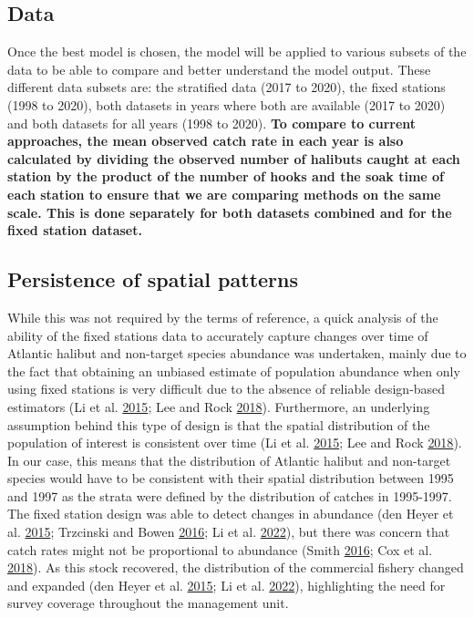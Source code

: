 \documentclass[12pt]{article}\usepackage[]{graphicx}\usepackage[]{color}
\begin{document}
\hypertarget{data}{%
\subsection{Data}\label{data}}

Once the best model is chosen, the model will be applied to various subsets of the data to be able to compare and better understand the model output. These different data subsets are: the stratified data (2017 to 2020), the fixed stations (1998 to 2020), both datasets in years where both are available (2017 to 2020) and both datasets for all years (1998 to 2020). \textbf{To compare to current approaches, the mean observed catch rate in each year is also calculated by dividing the observed number of halibuts caught at each station by the product of the number of hooks and the soak time of each station to ensure that we are comparing methods on the same scale. This is done separately for both datasets combined and for the fixed station dataset.}

\hypertarget{persistence-of-spatial-patterns}{%
\subsection{Persistence of spatial patterns}\label{persistence-of-spatial-patterns}}

While this was not required by the terms of reference, a quick analysis of the ability of the fixed stations data to accurately capture changes over time of Atlantic halibut and non-target species abundance was undertaken, mainly due to the fact that obtaining an unbiased estimate of population abundance when only using fixed stations is very difficult due to the absence of reliable design-based estimators (Li et al. \protect\hyperlink{ref-Li2015}{2015}; Lee and Rock \protect\hyperlink{ref-Lee2018}{2018}). Furthermore, an underlying assumption behind this type of design is that the spatial distribution of the population of interest is consistent over time (Li et al. \protect\hyperlink{ref-Li2015}{2015}; Lee and Rock \protect\hyperlink{ref-Lee2018}{2018}). In our case, this means that the distribution of Atlantic halibut and non-target species would have to be consistent with their spatial distribution between 1995 and 1997 as the strata were defined by the distribution of catches in 1995-1997. The fixed station design was able to detect changes in abundance (den Heyer et al. \protect\hyperlink{ref-DenHeyer2015}{2015}; Trzcinski and Bowen \protect\hyperlink{ref-Trzcinski2016}{2016}; Li et al. \protect\hyperlink{ref-Li2022}{2022}), but there was concern that catch rates might not be proportional to abundance (Smith \protect\hyperlink{ref-Smith2016a}{2016}; Cox et al. \protect\hyperlink{ref-Cox2018}{2018}). As this stock recovered, the distribution of the commercial fishery changed and expanded (den Heyer et al. \protect\hyperlink{ref-DenHeyer2015}{2015}; Li et al. \protect\hyperlink{ref-Li2022}{2022}), highlighting the need for survey coverage throughout the management unit.
\end{document}
